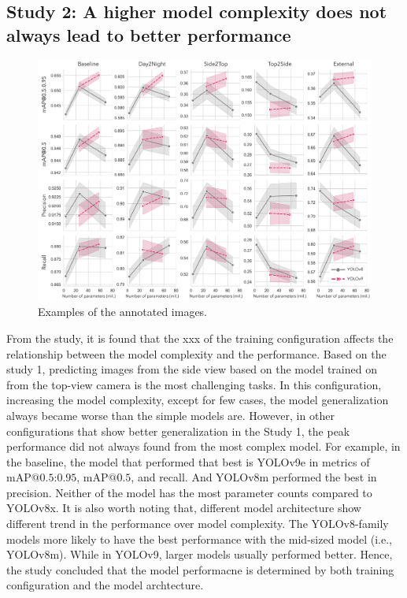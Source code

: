 \subsection*{Study 2: A higher model complexity does not always lead to better performance}


\begin{figure}[H]
    \centering
    \includegraphics[width=1\textwidth]{figure_4.jpg}
    \caption{Examples of the annotated images.}
    \label{fig:models}
\end{figure}


From the study, it is found that the xxx of the training configuration affects the relationship between the model complexity and the performance. Based on the study 1, predicting images from the side view based on the model trained on from the top-view camera is the most challenging tasks. In this configuration, increasing the model complexity, except for few cases, the model generalization always became worse than the simple models are. However, in other configurations that show better generalization in the Study 1, the peak performance did not always found from the most complex model. For example, in the baseline, the model that performed that best is YOLOv9e in metrics of $\text{mAP@{0.5:0.95}}$, $\text{mAP@{0.5}}$, and recall. And YOLOv8m performed the best in precision. Neither of the model has the most parameter counts compared to YOLOv8x. It is also worth noting that, different model architecture show different trend in the performance over model complexity. The YOLOv8-family models more likely to have the best performance with the mid-sized model (i.e., YOLOv8m). While in YOLOv9, larger models usually performed better. Hence, the study concluded that the model performacne is determined by both training configuration and the model archtecture.

